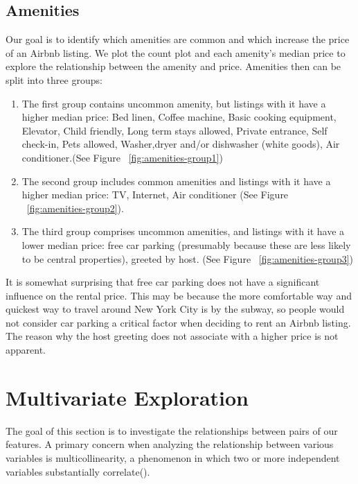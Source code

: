 \subsection{Amenities}

Our goal is to identify which amenities are common and which increase the price
of an Airbnb listing. We plot the count plot and each amenity's
median price to explore the relationship between the amenity and price.
Amenities then can be split into three groups:

\begin{enumerate}

  \item The first group contains uncommon amenity, but listings with it have a
    higher median price: Bed linen, Coffee machine, Basic cooking equipment,
    Elevator, Child friendly, Long term stays allowed, Private entrance, Self
    check-in, Pets allowed, Washer,dryer and/or dishwasher (white goods), Air
    conditioner.(See Figure ~\ref{fig:amenities-group1})

  \item The second group includes common amenities and listings with it have a
      higher median price: TV, Internet, Air conditioner (See Figure
      ~\ref{fig:amenities-group2}).

  \item The third group comprises uncommon amenities, and listings with it have
      a lower median price:  free car parking (presumably because these are less
      likely to be central properties), greeted by host. (See Figure
      ~\ref{fig:amenities-group3})

\end{enumerate}

It is somewhat surprising that free car parking does not have a significant
influence on the rental price. This may be because the more comfortable way and
quickest way to travel around New York City is by the subway, so people would
not consider car parking a critical factor when deciding to rent an Airbnb
listing. The reason why the host greeting does not associate with a higher price
is not apparent.

\section{Multivariate Exploration}
\label{sec:multivariate-exploration}

The goal of this section is to investigate the relationships between pairs of
our features. A primary concern when analyzing the relationship between various
variables is multicollinearity, a phenomenon in which two or more independent
variables substantially correlate(\textcite{cohen2013applied}).

